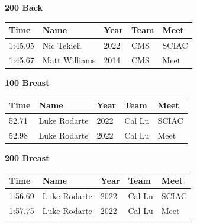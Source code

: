 \vspace{1.2em}
\noindent\begin{minipage}[t]{0.98\textwidth}
\centering
\textbf{\textcolor{teamprimary}{200 Back}}\par
\vspace{0.5em}
\centering
\small
\renewcommand{\arraystretch}{1.0}
\setlength{\tabcolsep}{4pt}
\begin{tabular}{@{}p{2.5cm}p{4.5cm}p{1.5cm}p{2.5cm}p{2.5cm}@{}}
\toprule
\textbf{Time} & \textbf{Name} & \textbf{Year} & \textbf{Team} & \textbf{Meet} \\
\midrule
1:45.05 & Nic Tekieli & 2022 & CMS & SCIAC \\
1:45.67 & Matt Williams & 2014 & CMS & Meet \\
\bottomrule
\end{tabular}
\end{minipage}
\vspace{1.2em}
\noindent\begin{minipage}[t]{0.98\textwidth}
\centering
\textbf{\textcolor{teamprimary}{100 Breast}}\par
\vspace{0.5em}
\centering
\small
\renewcommand{\arraystretch}{1.0}
\setlength{\tabcolsep}{4pt}
\begin{tabular}{@{}p{2.5cm}p{4.5cm}p{1.5cm}p{2.5cm}p{2.5cm}@{}}
\toprule
\textbf{Time} & \textbf{Name} & \textbf{Year} & \textbf{Team} & \textbf{Meet} \\
\midrule
52.71 & Luke Rodarte & 2022 & Cal Lu & SCIAC \\
52.98 & Luke Rodarte & 2022 & Cal Lu & Meet \\
\bottomrule
\end{tabular}
\end{minipage}
\vspace{1.2em}
\noindent\begin{minipage}[t]{0.98\textwidth}
\centering
\textbf{\textcolor{teamprimary}{200 Breast}}\par
\vspace{0.5em}
\centering
\small
\renewcommand{\arraystretch}{1.0}
\setlength{\tabcolsep}{4pt}
\begin{tabular}{@{}p{2.5cm}p{4.5cm}p{1.5cm}p{2.5cm}p{2.5cm}@{}}
\toprule
\textbf{Time} & \textbf{Name} & \textbf{Year} & \textbf{Team} & \textbf{Meet} \\
\midrule
1:56.69 & Luke Rodarte & 2022 & Cal Lu & SCIAC \\
1:57.75 & Luke Rodarte & 2022 & Cal Lu & Meet \\
\bottomrule
\end{tabular}
\end{minipage}
